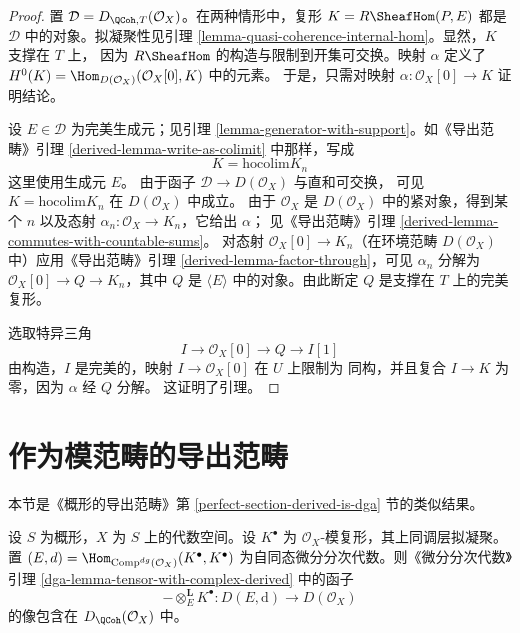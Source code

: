 \begin{proof}
置 $\mathcal{D} = D_{\QCoh, T}(\mathcal{O}_X)$。在两种情形中，复形
$K = R\SheafHom(P, E)$ 都是 $\mathcal{D}$ 中的对象。拟凝聚性见引理
\ref{lemma-quasi-coherence-internal-hom}。显然，$K$ 支撑在 $T$ 上，
因为 $R\SheafHom$ 的构造与限制到开集可交换。映射 $\alpha$ 定义了
$H^0(K) = \Hom_{D(\mathcal{O}_X)}(\mathcal{O}_X[0], K)$ 中的元素。
于是，只需对映射 $\alpha : \mathcal{O}_X[0] \to K$ 证明结论。

\medskip\noindent
设 $E \in \mathcal{D}$ 为完美生成元；见引理
\ref{lemma-generator-with-support}。如《导出范畴》引理
\ref{derived-lemma-write-as-colimit} 中那样，写成
$$
K = \text{hocolim} K_n
$$
这里使用生成元 $E$。
由于函子 $\mathcal{D} \to D(\mathcal{O}_X)$ 与直和可交换，
可见 $K = \text{hocolim} K_n$ 在 $D(\mathcal{O}_X)$ 中成立。
由于 $\mathcal{O}_X$ 是 $D(\mathcal{O}_X)$ 中的紧对象，得到某个 $n$
以及态射 $\alpha_n : \mathcal{O}_X \to K_n$，它给出 $\alpha$；
见《导出范畴》引理
\ref{derived-lemma-commutes-with-countable-sums}。
对态射 $\mathcal{O}_X[0] \to K_n$（在环境范畴
$D(\mathcal{O}_X)$ 中）应用《导出范畴》引理
\ref{derived-lemma-factor-through}，可见 $\alpha_n$ 分解为
$\mathcal{O}_X[0] \to Q \to K_n$，其中 $Q$ 是
$\langle E \rangle$ 中的对象。由此断定 $Q$ 是支撑在 $T$ 上的完美复形。

\medskip\noindent
选取特异三角
$$
I \to \mathcal{O}_X[0] \to Q \to I[1]
$$
由构造，$I$ 是完美的，映射 $I \to \mathcal{O}_X[0]$ 在 $U$ 上限制为
同构，并且复合 $I \to K$ 为零，因为 $\alpha$ 经 $Q$ 分解。
这证明了引理。
\end{proof}








\section{作为模范畴的导出范畴}
\label{section-derived-is-dga}

\noindent
本节是《概形的导出范畴》第
\ref{perfect-section-derived-is-dga} 节的类似结果。

\begin{lemma}
\label{lemma-tensor-with-QCoh-complex}
设 $S$ 为概形，$X$ 为 $S$ 上的代数空间。设 $K^\bullet$
为 $\mathcal{O}_X$-模复形，其上同调层拟凝聚。置
$(E, d) = \Hom_{\text{Comp}^{dg}(\mathcal{O}_X)}(K^\bullet, K^\bullet)$
为自同态微分分次代数。则《微分分次代数》引理
\ref{dga-lemma-tensor-with-complex-derived} 中的函子
$$
- \otimes_E^\mathbf{L} K^\bullet :
D(E, \text{d}) \longrightarrow D(\mathcal{O}_X)
$$
的像包含在 $D_\QCoh(\mathcal{O}_X)$ 中。
\end{lemma}

